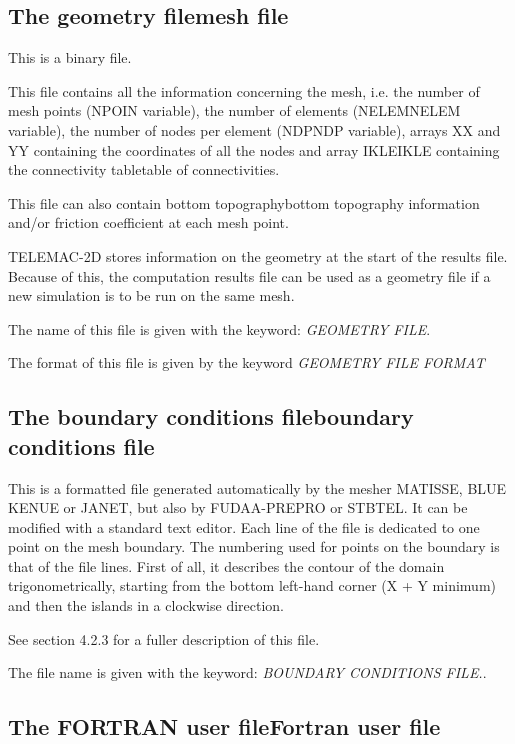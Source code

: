 \subsection{ The geometry filemesh file}

 This is a binary file.

 This file contains all the information concerning the mesh, i.e. the number of mesh points (NPOIN variable), the number of elements (NELEMNELEM variable), the number of nodes per element (NDPNDP variable), arrays XX and YY containing the coordinates of all the nodes and array IKLEIKLE containing the connectivity tabletable of connectivities.

 This file can also contain bottom topographybottom topography information and/or friction coefficient at each mesh point.

 TELEMAC-2D stores information on the geometry at the start of the results file. Because of this, the computation results file can be used as a geometry file if a new simulation is to be run on the same mesh.

 The name of this file is given with the keyword: \textit{GEOMETRY FILE}.

 The format of this file is given by the keyword \textit{GEOMETRY FILE FORMAT}


\subsection{  The boundary conditions fileboundary conditions file}

 This is a formatted file generated automatically by the mesher MATISSE, BLUE KENUE or JANET, but also by FUDAA-PREPRO or STBTEL. It can be modified with a standard text editor. Each line of the file is dedicated to one point on the mesh boundary. The numbering used for points on the boundary is that of the file lines. First of all, it describes the contour of the domain trigonometrically, starting from the bottom left-hand corner (X + Y minimum) and then the islands in a clockwise direction.

 See section 4.2.3 for a fuller description of this file.

 The file name is given with the keyword: \textit{BOUNDARY CONDITIONS FILE.}.


\subsection{ The FORTRAN user fileFortran user file}

